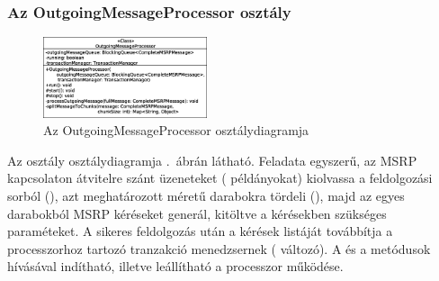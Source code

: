 \subsubsection*{Az OutgoingMessageProcessor osztály}
\label{sec:msrp_outgoingprocessor}
\begin{figure}
  \vspace{-15pt}
  \begin{center}
    \includegraphics[width=0.43\textwidth]{img/class_diagrams/OutgoingMessageProcessor.eps}
  \end{center}
  \vspace{-15pt}
  \captionsetup{font=scriptsize}
  \caption{Az OutgoingMessageProcessor osztálydiagramja}
   \label{fig:class_outgoingprocessor}
  \vspace{-10pt}
\end{figure}

Az  osztály osztálydiagramja .~ábrán látható. Feladata egyszerű, az MSRP kapcsolaton átvitelre szánt üzeneteket ( példányokat) kiolvassa a feldolgozási sorból (), azt meghatározott méretű darabokra tördeli (), majd az egyes darabokból MSRP kéréseket generál, kitöltve a kérésekben szükséges paraméteket. A sikeres feldolgozás után a kérések listáját továbbítja a processzorhoz tartozó tranzakció menedzsernek ( változó). A  és a  metódusok hívásával indítható, illetve leállítható a processzor működése. 

